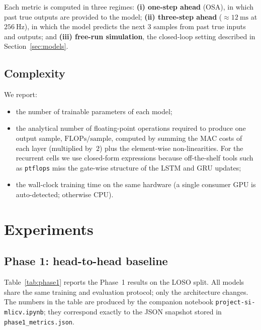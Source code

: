 \documentclass[conference]{IEEEtran}
\begin{document}
Each metric is computed in three regimes:
\textbf{(i) one-step ahead} (OSA), in which past true outputs are
provided to the model; \textbf{(ii) three-step ahead} ($\approx
12~\mathrm{ms}$ at $256~\mathrm{Hz}$), in which the model predicts the
next $3$ samples from past true inputs and outputs; and
\textbf{(iii) free-run simulation}, the closed-loop setting described
in Section~\ref{sec:models}.

\subsection{Complexity}
We report:
\begin{itemize}
    \item the number of trainable parameters of each model;
    \item the analytical number of floating-point operations
          required to produce one output sample,
          $\mathrm{FLOPs}/\mathrm{sample}$, computed by summing the
          MAC costs of each layer (multiplied by~$2$) plus the
          element-wise non-linearities. For the recurrent cells we
          use closed-form expressions because off-the-shelf tools such
          as \texttt{ptflops} miss the gate-wise structure of the LSTM
          and GRU updates;
    \item the wall-clock training time on the same hardware (a single
          consumer GPU is auto-detected; otherwise CPU).
\end{itemize}

\section{Experiments}\label{sec:exp}

\subsection{Phase 1: head-to-head baseline}\label{sec:phase1}

Table~\ref{tab:phase1} reports the Phase~1 results on the LOSO split.
All models share the same training and evaluation protocol; only the
architecture changes. The numbers in the table are produced by the
companion notebook \texttt{project-si-mlicv.ipynb}; they correspond
exactly to the JSON snapshot stored in
\texttt{phase1\_metrics.json}.
\end{document}
